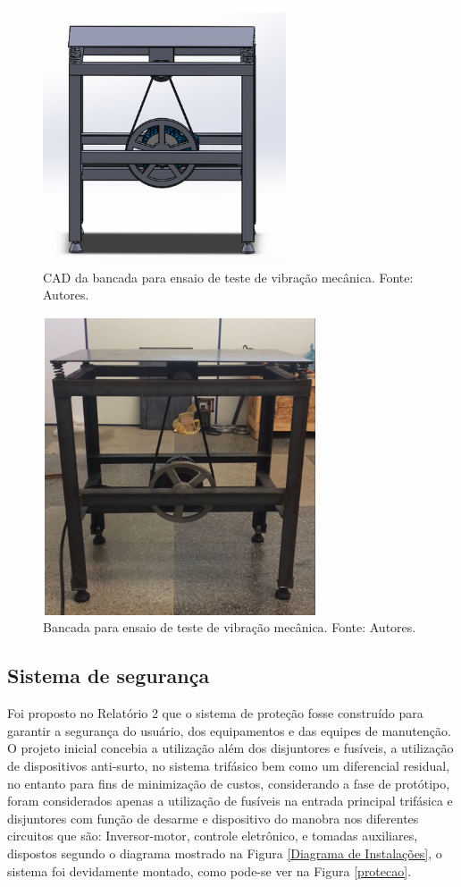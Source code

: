 \begin{figure}[H]
    \centering      \includegraphics[keepaspectratio=true,scale=1]{figuras/imaginario.png}
    \caption{CAD da bancada para ensaio de teste de vibração mecânica. Fonte: Autores.}
    \label{bancada}
\end{figure}

\begin{figure}[H]
    \centering      \includegraphics[keepaspectratio=true,scale=1]{figuras/real.png}
    \caption{Bancada para ensaio de teste de vibração mecânica. Fonte: Autores.}
    \label{Bancada}
\end{figure}

\subsection{Sistema de segurança}

    Foi proposto no Relatório 2 que o sistema de proteção fosse construído para garantir a segurança do usuário, dos equipamentos e das equipes de manutenção.
    O projeto inicial concebia a utilização além dos disjuntores e fusíveis, a utilização de dispositivos anti-surto, no sistema trifásico bem como um diferencial residual, no entanto para fins de minimização de custos, considerando a fase de protótipo, foram considerados apenas a utilização de fusíveis na entrada principal trifásica e disjuntores com função de desarme e dispositivo do manobra nos diferentes circuitos que são: Inversor-motor, controle eletrônico, e tomadas auxiliares, dispostos segundo o diagrama mostrado na Figura \ref{Diagrama de Instalações}, o sistema foi devidamente montado, como pode-se ver na Figura \ref{protecao}.

